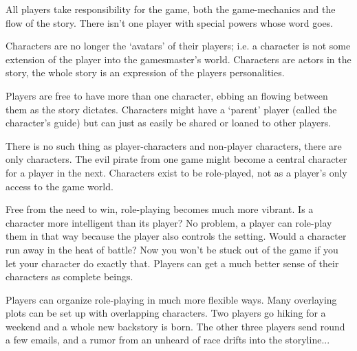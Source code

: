 \documentclass[twoside]{book}
\begin{document}
\begin{enumerate}
\begin{item}
All players take responsibility for the game, both the
   game-mechanics and the flow of the story. There isn't one player
   with special powers whose word goes.
\end{item}

\begin{item} Characters are no longer the `avatars' of their players; i.e. a
   character is not some extension of the player into the
   gamesmaster's world. Characters are actors in the story, the whole
   story is an expression of the players personalities.
\end{item}

\begin{item} Players are free to have more than one character, ebbing an flowing
   between them as the story dictates. Characters might have a
   `parent' player (called the character's guide) but can just as
   easily be shared or loaned to other players.
\end{item}

\begin{item} There is no such thing as player-characters and non-player
   characters, there are only characters. The evil pirate from one
   game might become a central character for a player in the
   next. Characters exist to be role-played, not as a player's only
   access to the game world.
\end{item}

\begin{item} Free from the need to win, role-playing becomes much more
   vibrant. Is a character more intelligent than its player? No
   problem, a player can role-play them in that way because the player
   also controls the setting. Would a character run away in the heat
   of battle? Now you won't be stuck out of the game if you let your
   character do exactly that. Players can get a much better sense of
   their characters as complete beings.
\end{item}

\begin{item} Players can organize role-playing in much more flexible ways. Many
   overlaying plots can be set up with overlapping characters. Two
   players go hiking for a weekend and a whole new backstory is
   born. The other three players send round a few emails, and a rumor
   from an unheard of race drifts into the storyline...
\end{item}


\end{enumerate}
\end{document}
